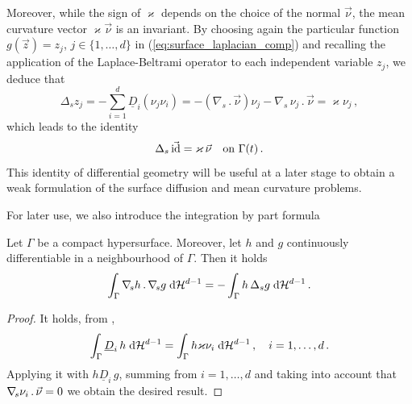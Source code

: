 Moreover, while the sign of $\varkappa$ depends on the choice of the normal
$\vec\nu$, the mean curvature vector $\varkappa \vec\nu$ is an invariant. By
choosing again the particular function $g(\vec z) = z_j$, $j \in \{ 1,
\hdots, d \}$ in (\ref{eq:surface_laplacian_comp}) and recalling the application
of the Laplace-Beltrami operator to each independent variable $z_j$, we deduce
that
\begin{equation}
\Delta_s z_j = - \sum_{i = 1}^{d} \underline{D}_i (\nu_j \nu_i) =
- (\nabla_s \,.\, \vec\nu) \nu_j - \nabla_s \, \nu_j \,.\, \vec\nu = \varkappa
\nu_j\, ,
\end{equation}
which leads to the identity
\begin{equation} \label{eq:LBop}
\Delta_s\, \vec {\rm id} = \varkappa\, \vec\nu \quad \mbox{on $\Gamma(t)$}\,.
\end{equation}
This identity of differential geometry will be useful at a later stage to
obtain a weak formulation of the surface diffusion and mean curvature problems.

For later use, we also introduce the integration by part formula
\begin{lemma}
Let $\Gamma$ be a compact hypersurface. Moreover, let $h$ and $g$ continuously
differentiable in a neighbourhood of $\Gamma$. Then it holds
\begin{equation}\label{eq:integration_by_part}
\int_\Gamma \nabla_{\!s} h\,.\,\nabla_{\!s} g \;{\rm d}{\cal H}^{d-1} =-\int_\Gamma h\,\Delta_s g\;{\rm d}{\cal H}^{d-1}\,.
\end{equation}

\begin{proof}
It holds, from \cite{GilbargT83},
\begin{equation*}
\int_\Gamma \underline{D}_i\,h \;{\rm d}{\cal H}^{d-1} = \int_\Gamma
h\varkappa\nu_i\;{\rm d}{\cal H}^{d-1}\,,
\quad i=1,\ldots,d\,.
\end{equation*}
Applying it with $h\underline{D}_i\,g$, summing from $i=1,\ldots,d$ and taking
into account that $\nabla_{\!s}\nu_i\,.\,\vec \nu=0$ we obtain the desired result.
\end{proof}

\end{lemma}

